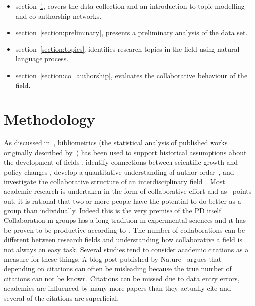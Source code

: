 \begin{itemize}
    \item section~\ref{section:methodology}, covers the data collection and an introduction
    to topic modelling and co-authorship networks.
    \item section~\ref{section:preliminary}, presents a preliminary analysis of the
    data set.
    \item section~\ref{section:topics}, identifies research topics in the field using
    natural language process.
    \item section~\ref{section:co_authorship}, evaluates the collaborative behaviour
    of the field.
\end{itemize}

\section{Methodology}\label{section:methodology}

As discussed in~\cite{youngblood2018}, bibliometrics (the statistical analysis
of published works originally described by~\cite{pritchard1969}) has been used
to support historical assumptions about the development of fields
\cite{raina1998}, identify connections between scientific growth and policy
changes \cite{das2016}, develop a quantitative understanding of author
order~\cite{sekara2018}, and investigate the collaborative structure of an
interdisciplinary field~\cite{Liu2015}. Most academic research is undertaken in
the form of collaborative effort and as~\cite{Kyvik2017} points out, it is
rational that two or more people have the potential to do better as a group
than individually. Indeed this is the very premise of the PD itself.
Collaboration in groups has a long tradition in experimental
sciences and it has be proven to be productive according
to~\cite{Etzkowitz1992}. The number of collaborations can be different
between research fields and understanding how collaborative a field is not
always an easy task. Several studies tend to consider academic citations as a
measure for these things. A blog post published by Nature~\cite{nature_blog}
argues that depending on citations can often be misleading because the true
number of citations can not be known. Citations can be missed due to data entry
errors, academics are influenced by many more papers than they actually cite and
several of the citations are superficial.

